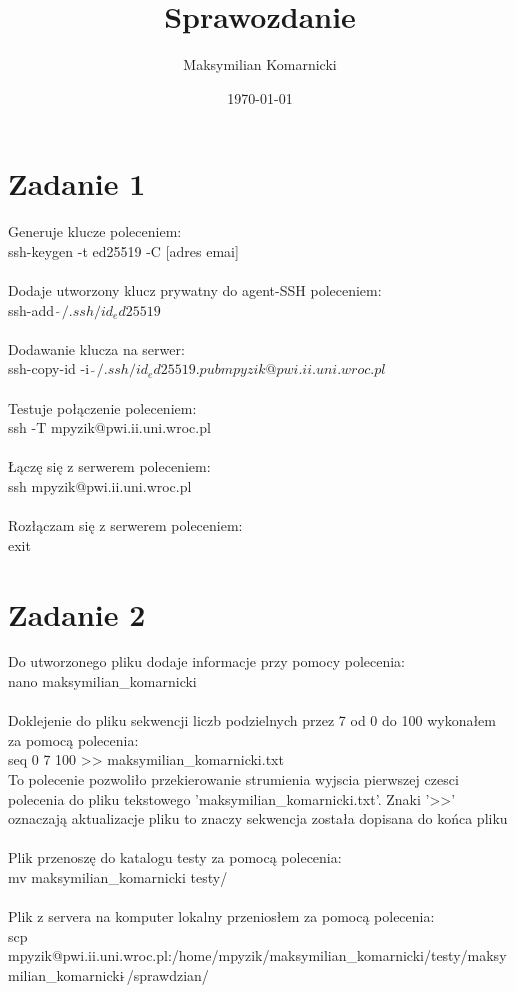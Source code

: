 \documentclass[a4paper, 11pt]{article}
\begin{document}
\title{Sprawozdanie}
\author{Maksymilian Komarnicki}
\date{\today}
\maketitle

\section{Zadanie 1}

Generuje klucze poleceniem:\\
ssh-keygen -t ed25519 -C [adres emai]\\
\\
Dodaje utworzony klucz prywatny do agent-SSH poleceniem:\\
ssh-add $\tilde{\ }/.ssh/id_ed25519$\\
\\
Dodawanie klucza na serwer:\\
ssh-copy-id -i $\tilde{\ }/.ssh/id_ed25519.pub mpyzik@pwi.ii.uni.wroc.pl$\\
\\
Testuje połączenie poleceniem:\\
ssh -T mpyzik@pwi.ii.uni.wroc.pl\\
\\
Łączę się z serwerem poleceniem:\\
ssh mpyzik@pwi.ii.uni.wroc.pl\\
\\
Rozłączam się z serwerem poleceniem:\\
exit\\

\section{Zadanie 2}

Do utworzonego pliku dodaje informacje przy pomocy polecenia:\\
nano maksymilian\_komarnicki\\
\\
Doklejenie do pliku sekwencji liczb podzielnych przez 7 od 0 do 100 wykonałem za pomocą polecenia:\\
seq 0 7 100 >> maksymilian\_komarnicki.txt\\
To polecenie pozwoliło przekierowanie strumienia wyjscia pierwszej czesci polecenia do pliku
tekstowego 'maksymilian\_komarnicki.txt'. Znaki '>>' oznaczają aktualizacje pliku to znaczy sekwencja
została dopisana do końca pliku\\
\\
Plik przenoszę do katalogu testy za pomocą polecenia:\\
mv maksymilian\_komarnicki testy/\\
\\
Plik z servera na komputer lokalny przeniosłem za pomocą polecenia:\\
scp mpyzik@pwi.ii.uni.wroc.pl:/home/mpyzik/maksymilian\_komarnicki/testy/maksymilian\_komarnicki$\tilde{\ }$/sprawdzian/\\
\end{document}
